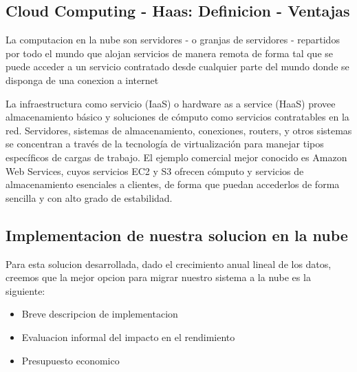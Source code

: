 \documentclass{article}
\begin{document}
\subsection{Cloud Computing - Haas: Definicion - Ventajas}
La computacion en la nube son servidores - o granjas de servidores - repartidos por todo el mundo que alojan servicios de manera remota de forma tal que se puede acceder a un servicio contratado desde cualquier parte del mundo donde se disponga de una conexion a internet

La infraestructura como servicio (IaaS) o hardware as a service (HaaS) provee almacenamiento básico y soluciones de cómputo como servicios contratables en la red.
Servidores, sistemas de almacenamiento, conexiones, routers, y otros sistemas se concentran a través de la tecnología de virtualización para manejar tipos específicos de cargas de trabajo. El ejemplo comercial mejor conocido es Amazon Web Services, cuyos servicios EC2 y S3 ofrecen cómputo y servicios de almacenamiento esenciales a clientes, de forma que puedan accederlos de forma sencilla y con alto grado de estabilidad. 

\subsection{Implementacion de nuestra solucion en la nube}

Para esta solucion desarrollada, dado el crecimiento anual lineal de los datos, creemos que la mejor opcion para migrar nuestro sistema a la nube es la siguiente:

\begin{itemize}
  \item Breve descripcion de implementacion
  \item Evaluacion informal del impacto en el rendimiento
  \item Presupuesto economico
\end{itemize}
\end{document}
